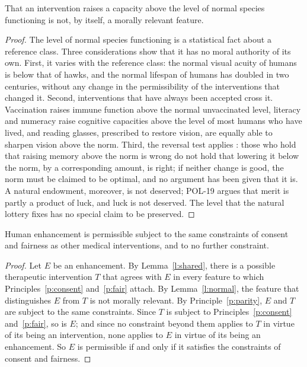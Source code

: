 \documentclass{situationist-preprint}
\begin{document}
\begin{lemma}\label{l:normal}
That an intervention raises a capacity above the level of normal species functioning is not, by itself, a morally relevant feature.
\end{lemma}

\begin{proof}
The level of normal species functioning is a statistical fact about a reference class. Three considerations show that it has no moral authority of its own. First, it varies with the reference class: the normal visual acuity of humans is below that of hawks, and the normal lifespan of humans has doubled in two centuries, without any change in the permissibility of the interventions that changed it. Second, interventions that have always been accepted cross it. Vaccination raises immune function above the normal unvaccinated level, literacy and numeracy raise cognitive capacities above the level of most humans who have lived, and reading glasses, prescribed to restore vision, are equally able to sharpen vision above the norm. Third, the reversal test applies \citep{BostromOrd2006}: those who hold that raising memory above the norm is wrong do not hold that lowering it below the norm, by a corresponding amount, is right; if neither change is good, the norm must be claimed to be optimal, and no argument has been given that it is. A natural endowment, moreover, is not deserved; POL-19 argues that merit is partly a product of luck, and luck is not deserved. The level that the natural lottery fixes has no special claim to be preserved.
\end{proof}

\begin{theorem}\label{t:main}
Human enhancement is permissible subject to the same constraints of consent and fairness as other medical interventions, and to no further constraint.
\end{theorem}

\begin{proof}
Let $E$ be an enhancement. By Lemma~\ref{l:shared}, there is a possible therapeutic intervention $T$ that agrees with $E$ in every feature to which Principles~\ref{p:consent} and~\ref{p:fair} attach. By Lemma~\ref{l:normal}, the feature that distinguishes $E$ from $T$ is not morally relevant. By Principle~\ref{p:parity}, $E$ and $T$ are subject to the same constraints. Since $T$ is subject to Principles~\ref{p:consent} and~\ref{p:fair}, so is $E$; and since no constraint beyond them applies to $T$ in virtue of its being an intervention, none applies to $E$ in virtue of its being an enhancement. So $E$ is permissible if and only if it satisfies the constraints of consent and fairness.
\end{proof}
\end{document}
